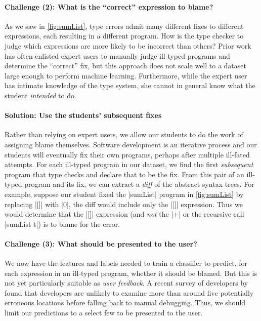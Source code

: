 \paragraph{\textbf{Challenge (2): What is the ``correct'' expression to blame?}}
As we saw in \autoref{fig:sumList}, type errors admit many different
fixes to different expressions, each resulting in a different program.
%
How is the type checker to judge which expressions are more likely to be
incorrect than others?
%
Prior work has often enlisted expert users to manually judge ill-typed
programs and determine the ``correct'' fix, but this approach does not
scale well to a dataset large enough to perform machine learning.
%
Furthermore, while the expert user has intimate knowledge of the type
system, she cannot in general know what the student \emph{intended} to do.

\paragraph{\textbf{Solution: Use the students' subsequent fixes}}
%
Rather than relying on expert users, we allow our students to do the
work of assigning blame themselves.
%
Software development is an iterative process and our students will
eventually fix their own programs, perhaps after multiple ill-fated
attempts.
%
For each ill-typed program in our dataset, we find the first
\emph{subsequent} program that type checks and declare that to be the
fix.
%
From this pair of an ill-typed program and its fix, we can extract a
\emph{diff} of the abstract syntax trees.
%
For example, suppose our student fixed the |sumList| program in
\autoref{fig:sumList} by replacing |[]| with |0|, the diff would include
only the |[]| expression.
%
Thus we would determine that the |[]| expression (and \emph{not} the
|+| or the recursive call |sumList t|) is to blame for the error.


\paragraph{\textbf{Challenge (3): What should be presented to the user?}}
We now have the features and labels needed to train a classifier to
predict, for each expression in an ill-typed program, whether it should
be blamed.
%
But this is not yet particularly suitable as \emph{user feedback}.
%
A recent survey of developers by \citet{Kochhar2016-oc} found that
developers are unlikely to examine more than around five potentially
erroneous locations before falling back to manual debugging.
%
Thus, we should limit our predictions to a select few to be presented to
the user.


